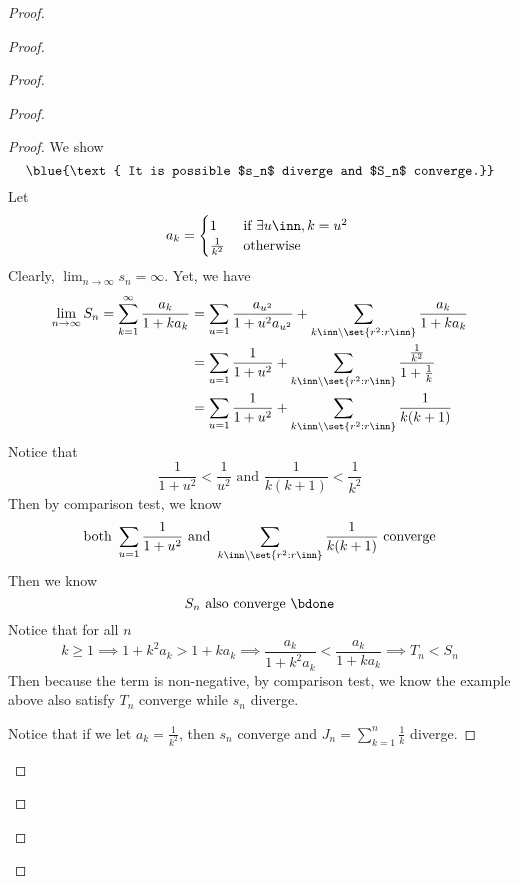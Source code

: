 \documentclass{report}
\begin{document}
\begin{proof}
\begin{proof}
\begin{proof}
\begin{proof}
\begin{proof}
We show
\begin{equation}
\blue{\text{ It is possible $s_n$ diverge and $S_n$ converge.}}
\end{equation}
Let 
\begin{equation}
a_k=\begin{cases}
  1& \text{ if $\exists u\inn, k=u^2$ }\\
  \frac{1}{k^2}& \text{ otherwise }
\end{cases}
\end{equation}
Clearly,  $\lim_{n\to\infty}s_n=\infty$. Yet, we have
\begin{align}
  \lim_{n\to\infty}S_n=\sum_{k=1}^\infty \frac{a_k}{1+ka_k}&=\sum_{u=1}\frac{a_{u^2}}{1+u^2a_{u^2}}+\sum_{k\inn\setminus \set{r^2:r\inn}}\frac{a_k}{1+ka_k}\\
&=\sum_{u=1}\frac{1}{1+u^2}+\sum_{k\inn\setminus \set{r^2:r\inn}}\frac{\frac{1}{k^2}}{1+\frac{1}{k}}\\
&=\sum_{u=1}\frac{1}{1+u^2}+\sum_{k\inn\setminus \set{r^2:r\inn}} \frac{1}{k(k+1)}
\end{align}
Notice that 
\begin{equation}
\frac{1}{1+u^2}<\frac{1}{u^2}\text{ and }\frac{1}{k(k+1)}<\frac{1}{k^2}
\end{equation}
Then by comparison test, we know 
\begin{equation}
\text{ both }\sum_{u=1}\frac{1}{1+u^2}\text{ and }\sum_{k\inn\setminus \set{r^2:r\inn}} \frac{1}{k(k+1)}\text{ converge }
\end{equation}
Then we know
\begin{equation}
S_n\text{ also converge }\bdone
\end{equation}
Notice that for all $n$
\begin{equation}
k\geq 1\implies 1+k^2a_k>1+ka_k\implies \frac{a_k}{1+k^2a_k}<\frac{a_k}{1+ka_k}\implies T_n<S_n
\end{equation}
Then because the term is non-negative, by comparison test, we know the example above also satisfy $T_n$ converge while $s_n$ diverge.

Notice that if we let $a_k=\frac{1}{k^2}$, then $s_n$ converge and $J_n=\sum_{k=1}^n \frac{1}{k}$ diverge. 


\end{proof}
\end{proof}
\end{proof}
\end{proof}
\end{proof}
\end{document}
